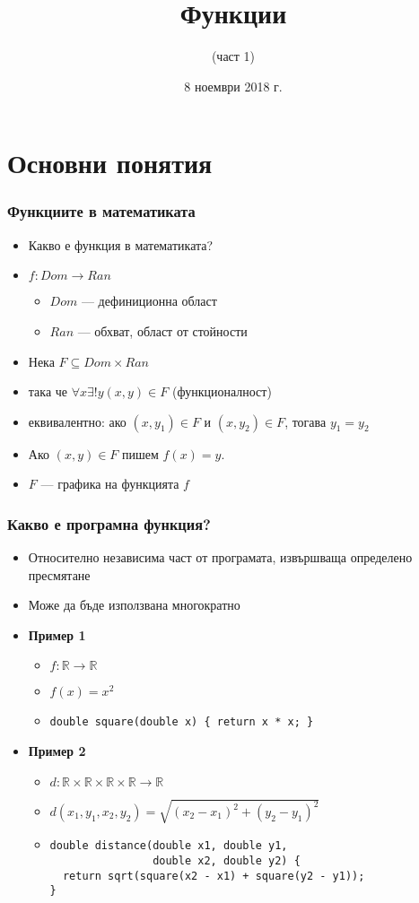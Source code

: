 \documentclass{beamer}
\title{Функции}
\subtitle{(част 1)}
\date{8 ноември 2018 г.}
\newcommand{\RR}{\mathbb{R}}
\begin{document}
\begin{frame}
  \titlepage
\end{frame}

\section{Основни понятия}

\begin{frame}
  \frametitle{Функциите в математиката}

  \begin{itemize}[<+->]
  \item Какво е функция в математиката?
  \item $f : Dom \to Ran$
    \begin{itemize}
    \item $Dom$ --- дефиниционна област
    \item $Ran$ --- обхват, област от стойности
    \end{itemize}
  \item Нека $F \subseteq Dom \times Ran$
  \item така че $\forall x \exists ! y (x,y) \in F$ (функционалност)
  \item еквивалентно: ако $(x,y_1) \in F$ и $(x,y_2) \in F$, тогава $y_1 = y_2$
  \item Ако $(x,y)\in F$ пишем $f(x) = y$.
  \item $F$ --- графика на функцията $f$
  \end{itemize}
\end{frame}

\begin{frame}[fragile]
  \frametitle{Какво е програмна функция?}

  \begin{itemize}[<+->]
  \item Относително независима част от програмата, извършваща определено пресмятане
  \item Може да бъде използвана многократно
  \item \textbf{Пример 1}
    \begin{itemize}
    \item $f:\RR \to \RR$
    \item $f(x) = x^2$
    \item \lstinline!double square(double x) { return x * x; }!
    \end{itemize}
  \item \textbf{Пример 2}
    \begin{itemize}
    \item $d:\RR\times\RR\times\RR\times\RR \to \RR$
    \item $d(x_1,y_1,x_2,y_2) = \sqrt{(x_2-x_1)^2 + (y_2-y_1)^2}$
    \item
\begin{lstlisting}
double distance(double x1, double y1,
                double x2, double y2) {
  return sqrt(square(x2 - x1) + square(y2 - y1));
}
\end{lstlisting}
    \end{itemize}
  \end{itemize}
\end{frame}
\end{document}
